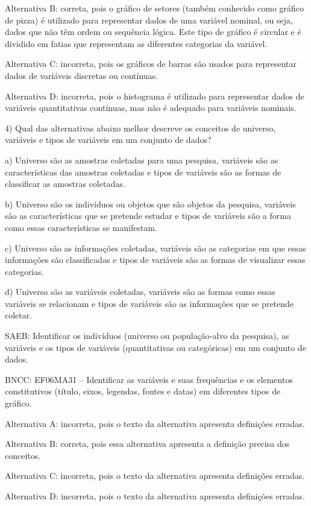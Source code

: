 Alternativa B: correta, pois o gráfico de setores (também conhecido como
gráfico de pizza) é utilizado para representar dados de uma variável
nominal, ou seja, dados que não têm ordem ou sequência lógica. Este tipo
de gráfico é circular e é dividido em fatias que representam as
diferentes categorias da variável.

Alternativa C: incorreta, pois os gráficos de barras são usados para
representar dados de variáveis discretas ou contínuas.

Alternativa D: incorreta, pois o histograma é utilizado para representar
dados de variáveis quantitativas contínuas, mas não é adequado para
variáveis nominais.

4) Qual das alternativas abaixo melhor descreve os conceitos de
universo, variáveis e tipos de variáveis em um conjunto de dados?

a) Universo são as amostras coletadas para uma pesquisa, variáveis são
as características das amostras coletadas e tipos de variáveis são as
formas de classificar as amostras coletadas.

b) Universo são os indivíduos ou objetos que são objetos da pesquisa,
variáveis são as características que se pretende estudar e tipos de
variáveis são a forma como essas características se manifestam.

c) Universo são as informações coletadas, variáveis são as categorias em
que essas informações são classificadas e tipos de variáveis são as
formas de visualizar essas categorias.

d) Universo são as variáveis coletadas, variáveis são as formas como
essas variáveis se relacionam e tipos de variáveis são as informações
que se pretende coletar.

SAEB: Identificar os indivíduos (universo ou população-alvo da
pesquisa), as variáveis e os tipos de variáveis (quantitativas ou
categóricas) em um conjunto de dados.

BNCC: EF06MA31 -- Identificar as variáveis e suas frequências e os
elementos constitutivos (título, eixos, legendas, fontes e datas) em
diferentes tipos de gráfico.

Alternativa A: incorreta, pois o texto da alternativa apresenta
definições erradas.

Alternativa B: correta, pois essa alternativa apresenta a definição
precisa dos conceitos.

Alternativa C: incorreta, pois o texto da alternativa apresenta
definições erradas.

Alternativa D: incorreta, pois o texto da alternativa apresenta
definições erradas.

